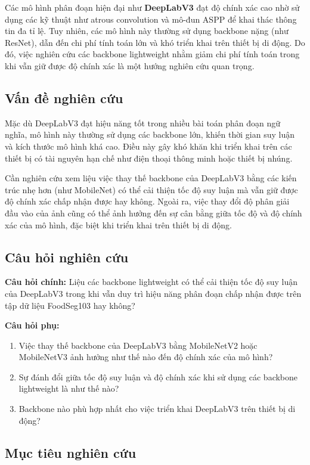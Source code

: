 Các mô hình phân đoạn hiện đại như \textbf{DeepLabV3} đạt độ chính xác cao nhờ sử dụng các kỹ thuật như atrous convolution và mô-đun ASPP để khai thác thông tin đa tỉ lệ. Tuy nhiên, các mô hình này thường sử dụng backbone nặng (như ResNet), dẫn đến chi phí tính toán lớn và khó triển khai trên thiết bị di động. Do đó, việc nghiên cứu các backbone lightweight nhằm giảm chi phí tính toán trong khi vẫn giữ được độ chính xác là một hướng nghiên cứu quan trọng.

\subsection{Vấn đề nghiên cứu}

Mặc dù DeepLabV3 đạt hiệu năng tốt trong nhiều bài toán phân đoạn ngữ nghĩa, mô hình này thường sử dụng các backbone lớn, khiến thời gian suy luận và kích thước mô hình khá cao. Điều này gây khó khăn khi triển khai trên các thiết bị có tài nguyên hạn chế như điện thoại thông minh hoặc thiết bị nhúng.

Cần nghiên cứu xem liệu việc thay thế backbone của DeepLabV3 bằng các kiến trúc nhẹ hơn (như MobileNet) có thể cải thiện tốc độ suy luận mà vẫn giữ được độ chính xác chấp nhận được hay không. Ngoài ra, việc thay đổi độ phân giải đầu vào của ảnh cũng có thể ảnh hưởng đến sự cân bằng giữa tốc độ và độ chính xác của mô hình, đặc biệt khi triển khai trên thiết bị di động.

\subsection{Câu hỏi nghiên cứu}

\textbf{Câu hỏi chính:} Liệu các backbone lightweight có thể cải thiện tốc độ suy luận của DeepLabV3 trong khi vẫn duy trì hiệu năng phân đoạn chấp nhận được trên tập dữ liệu FoodSeg103 hay không?

\textbf{Câu hỏi phụ:}
\begin{enumerate}
    \item Việc thay thế backbone của DeepLabV3 bằng MobileNetV2 hoặc MobileNetV3 ảnh hưởng như thế nào đến độ chính xác của mô hình?
    \item Sự đánh đổi giữa tốc độ suy luận và độ chính xác khi sử dụng các backbone lightweight là như thế nào?
    \item Backbone nào phù hợp nhất cho việc triển khai DeepLabV3 trên thiết bị di động?
\end{enumerate}

\subsection{Mục tiêu nghiên cứu}

